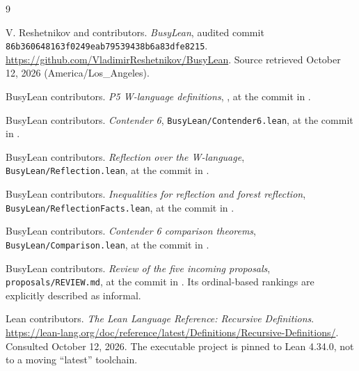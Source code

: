 \documentclass[11pt]{article}
\theoremstyle{definition}
\theoremstyle{remark}
\begin{document}
\begin{thebibliography}{9}
\raggedright
{}
V. Reshetnikov and contributors.
\emph{BusyLean}, audited commit
\texttt{86b360648163f0249eab79539438b6a83dfe8215}.
\url{https://github.com/VladimirReshetnikov/BusyLean}.
Source retrieved October 12, 2026 (America/Los\_Angeles).

BusyLean contributors.
\emph{P5 W-language definitions},
,
at the commit in \cite{repository}.

BusyLean contributors.
\emph{Contender 6}, \texttt{BusyLean/Contender6.lean},
at the commit in \cite{repository}.

BusyLean contributors.
\emph{Reflection over the W-language},
\texttt{BusyLean/Reflection.lean}, at the commit in \cite{repository}.

BusyLean contributors.
\emph{Inequalities for reflection and forest reflection},
\texttt{BusyLean/ReflectionFacts.lean}, at the commit in \cite{repository}.

BusyLean contributors.
\emph{Contender 6 comparison theorems},
\texttt{BusyLean/Comparison.lean}, at the commit in \cite{repository}.

BusyLean contributors.
\emph{Review of the five incoming proposals},
\texttt{proposals/REVIEW.md}, at the commit in \cite{repository}.
Its ordinal-based rankings are explicitly described as informal.

Lean contributors.
\emph{The Lean Language Reference: Recursive Definitions}.
\url{https://lean-lang.org/doc/reference/latest/Definitions/Recursive-Definitions/}.
Consulted October 12, 2026. The executable project is pinned to Lean 4.34.0,
not to a moving ``latest'' toolchain.
\end{thebibliography}
\end{document}
